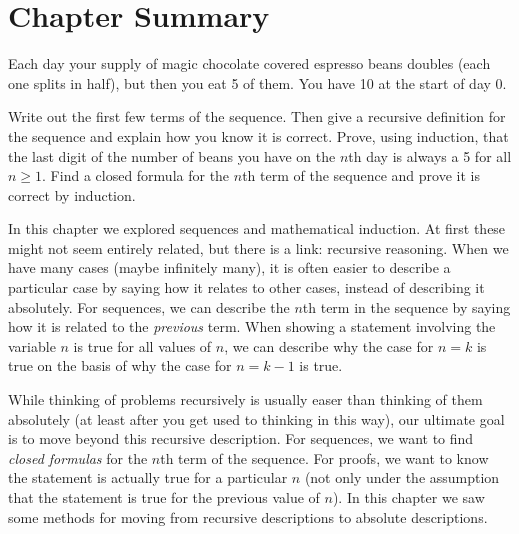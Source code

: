 \documentclass[12pt]{article}
\begin{document}
\section{Chapter Summary}

\begin{activity}
Each day your supply of magic chocolate covered espresso beans doubles (each one splits in half), but then you eat 5 of them.  You have 10 at the start of day 0. 

\begin{questions}
\question Write out the first few terms of the sequence.  Then give a recursive definition for the sequence and explain how you know it is correct.
\question Prove, using induction, that the last digit of the number of beans you have on the $n$th day is always a 5 for all $n \ge 1$.
\question Find a closed formula for the $n$th term of the sequence and prove it is correct by induction.
\end{questions}

\end{activity}

In this chapter we explored sequences and mathematical induction.  At first these might not seem entirely related, but there is a link: recursive reasoning.  When we have many cases (maybe infinitely many), it is often easier to describe a particular case by saying how it relates to other cases, instead of describing it absolutely.  For sequences, we can describe the $n$th term in the sequence by saying how it is related to the \emph{previous} term.  When showing a statement involving the variable $n$ is true for all values of $n$, we can describe why the case for $n = k$ is true on the basis of why the case for $n = k-1$ is true.

While thinking of problems recursively is usually easer than thinking of them absolutely (at least after you get used to thinking in this way), our ultimate goal is to move beyond this recursive description.  For sequences, we want to find \emph{closed formulas} for the $n$th term of the sequence.  For proofs, we want to know the statement is actually true for a particular $n$ (not only under the assumption that the statement is true for the previous value of $n$). In this chapter we saw some methods for moving from recursive descriptions to absolute descriptions.
\end{document}
